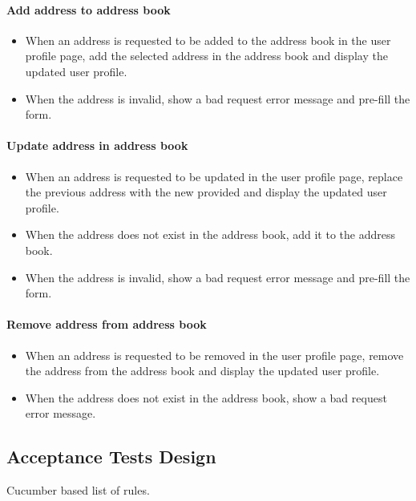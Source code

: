 \begin{appendices}
\paragraph{Add address to address book}
\begin{itemize}
	\item When an address is requested to be added to the address book in the user profile page, add
the selected address in the address book and display the updated user profile.
	\item When the address is invalid, show a bad request error message and pre-fill the form.
\end{itemize}

\paragraph{Update address in address book}
\begin{itemize}
	\item When an address is requested to be updated in the user profile page, replace the previous
address with the new provided and display the updated user profile.
	\item When the address does not exist in the address book, add it to the address book.
	\item When the address is invalid, show a bad request error message and pre-fill the form.
\end{itemize}

\paragraph{Remove address from address book}
\begin{itemize}
	\item When an address is requested to be removed in the user profile page, remove the address
from the address book and display the updated user profile.
	\item When the address does not exist in the address book, show a bad request error message.
\end{itemize}
 	
  
\subsection{Acceptance Tests Design}
Cucumber based list of rules.


\end{appendices}
